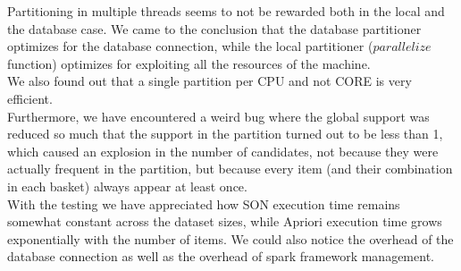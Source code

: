 \documentclass[a4paper]{article}
\begin{document}
	Partitioning in multiple threads seems to not be rewarded both in the local and the database case. We came to the conclusion that the database partitioner optimizes for the database connection, 
	while the local partitioner ($parallelize$ function) optimizes for exploiting all the resources of the machine.\\
	We also found out that a single partition per CPU and not CORE is very efficient.\\
	Furthermore, we have encountered a weird bug where the global support was reduced so much that the support in the partition
	turned out to be less than 1, which caused an explosion in the number of candidates, not because they were actually frequent
	in the partition, but because every item (and their combination in each basket) always appear at least once.\\

	With the testing we have appreciated how SON execution time remains somewhat constant across the dataset sizes, while Apriori execution time grows exponentially with the number of items.
	We could also notice the overhead of the database connection as well as the overhead of spark framework management.
		
\end{document}

